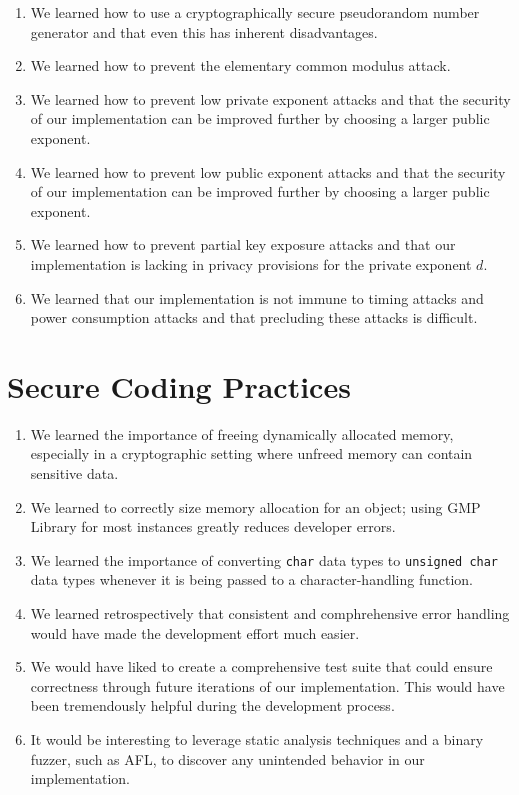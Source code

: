 \documentclass[a4paper]{article}
\begin{document}
\begin{enumerate}
    \item We learned how to use a cryptographically secure pseudorandom number generator and that even this has inherent disadvantages.

    \item We learned how to prevent the elementary common modulus attack.

    \item We learned how to prevent low private exponent attacks and that the security of our implementation can be improved further by choosing a larger public exponent.

    \item We learned how to prevent low public exponent attacks and that the security of our implementation can be improved further by choosing a larger public exponent.

    \item We learned how to prevent partial key exposure attacks and that our implementation is lacking in privacy provisions for the private exponent $d$.

    \item We learned that our implementation is not immune to timing attacks and power consumption attacks and that precluding these attacks is difficult.
\end{enumerate}

\section{Secure Coding Practices}

\begin{enumerate}
    \item We learned the importance of freeing dynamically allocated memory, especially in a cryptographic setting where unfreed memory can contain sensitive data.
        
    \item We learned to correctly size memory allocation for an object; using GMP Library for most instances greatly reduces developer errors.

    \item We learned the importance of converting {\tt char} data types to {\tt unsigned char} data types whenever it is being passed to a character-handling function.

    \item We learned retrospectively that consistent and comphrehensive error handling would have made the development effort much easier.

    \item We would have liked to create a comprehensive test suite that could ensure correctness through future iterations of our implementation. This would have been tremendously helpful during the development process.

    \item It would be interesting to leverage static analysis techniques and a binary fuzzer, such as AFL, to discover any unintended behavior in our implementation.
\end{enumerate}
\end{document}
